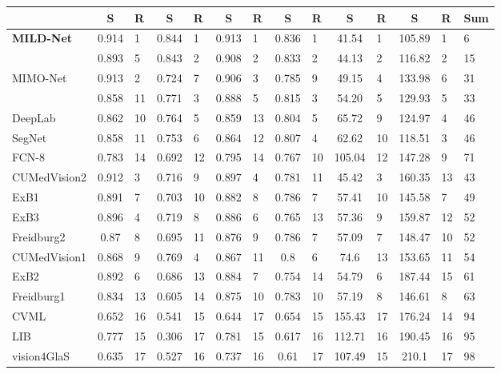 \documentclass[3p]{elsarticle}
\begin{document}
\begin{table}[h!]
\begin{center}
\begin{tabular}{|p{2.8cm}|c|p{0.25cm}|c|p{0.3cm}|c|p{0.3cm}|c|p{0.3cm}|c|p{0.3cm}|c|p{0.3cm}|p{0.85cm}|}
& \textbf{S} & \textbf{R} & \textbf{S} & \textbf{R}& \textbf{S} & \textbf{R} & \textbf{S} & \textbf{R}& \textbf{S} & \textbf{R} & \textbf{S} & \textbf{R}& \textbf{Sum}\\
\hline
 \textbf{MILD-Net} & 0.914 & 1 & 0.844 & 1 & 0.913 & 1 & 0.836 & 1 & 41.54 & 1 & 105.89 & 1 & 6\\
\cite{xu2017gland} & 0.893 & 5 & 0.843 & 2 & 0.908 & 2 & 0.833 & 2 & 44.13 & 2 & 116.82 & 2 & 15\\
MIMO-Net & 0.913 & 2 & 0.724 & 7 & 0.906 & 3 & 0.785 & 9 & 49.15 & 4 & 133.98 & 6 & 31\\
\cite{xu2016gland}  & 0.858 & 11 & 0.771& 3 & 0.888 & 5 & 0.815 & 3 & 54.20 & 5 & 129.93 & 5 & 33\\
DeepLab & 0.862 & 10 & 0.764& 5 & 0.859 & 13 & 0.804 & 5 & 65.72 & 9 & 124.97 & 4& 46\\
SegNet& 0.858 & 11 & 0.753& 6 & 0.864 & 12 & 0.807 & 4 & 62.62 & 10 & 118.51 & 3& 46\\
FCN-8& 0.783 & 14 & 0.692& 12 & 0.795 & 14 & 0.767 & 10 & 105.04 & 12 & 147.28 & 9& 71\\ \hline
CUMedVision2 & 0.912 & 3 & 0.716& 9 & 0.897 & 4 & 0.781 & 11 & 45.42 & 3 & 160.35 & 13 & 43\\
ExB1 & 0.891 & 7 & 0.703& 10 & 0.882 & 8 & 0.786 & 7 & 57.41 & 10 & 145.58 & 7& 49\\
ExB3 & 0.896 & 4 & 0.719& 8 & 0.886 & 6 & 0.765 & 13 & 57.36 & 9 & 159.87 & 12& 52\\
Freidburg2  & 0.87 & 8 & 0.695& 11 & 0.876 & 9 & 0.786 & 7 & 57.09 & 7 & 148.47 & 10 & 52\\
CUMedVision1 & 0.868 & 9 & 0.769& 4 & 0.867 & 11 & 0.8 & 6 & 74.6 & 13 & 153.65 & 11& 54\\
ExB2 & 0.892 & 6 & 0.686& 13 & 0.884 & 7 & 0.754 & 14 & 54.79 & 6 & 187.44 & 15& 61\\
Freidburg1 & 0.834 & 13 & 0.605& 14 & 0.875 & 10 & 0.783 & 10 & 57.19 & 8 & 146.61 & 8 & 63\\
CVML & 0.652 & 16 & 0.541& 15 & 0.644 & 17 & 0.654 & 15 & 155.43 & 17 & 176.24 & 14 & 94\\
LIB & 0.777 & 15 & 0.306& 17 & 0.781 & 15 & 0.617 & 16 & 112.71 & 16 & 190.45 & 16 & 95\\
vision4GlaS & 0.635 & 17 & 0.527& 16 & 0.737 & 16 & 0.61 & 17 & 107.49 & 15 & 210.1 & 17 & 98\\ \hline
\end{tabular}
\end{center}
\end{table}
\end{document}
